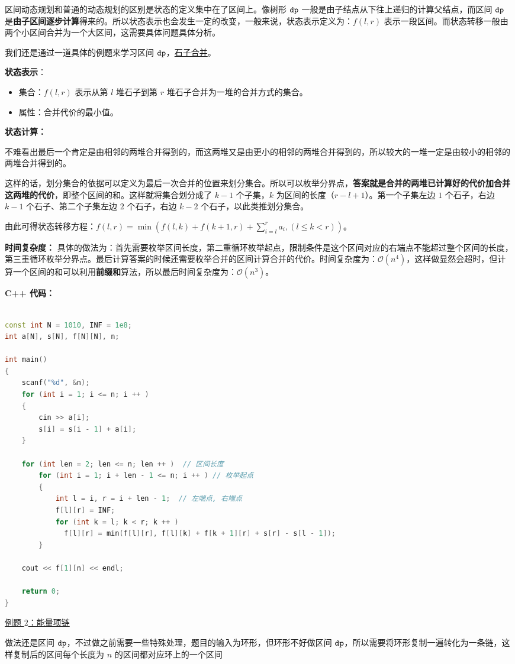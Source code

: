 
区间动态规划和普通的动态规划的区别是状态的定义集中在了区间上。像树形 $\tt dp$ 一般是由子结点从下往上递归的计算父结点，而区间 $\tt dp$ 是\textbf{由子区间逐步计算}得来的。所以状态表示也会发生一定的改变，一般来说，状态表示定义为：$f(l, r)$ 表示一段区间。而状态转移一般由两个小区间合并为一个大区间，这需要具体问题具体分析。

我们还是通过一道具体的例题来学习区间 $\tt dp$，\href{https://www.luogu.com.cn/problem/P1775}{石子合并}。

\textbf{状态表示}：
\begin{itemize}
\item 集合：$f(l, r)$ 表示从第 $l$ 堆石子到第 $r$ 堆石子合并为一堆的合并方式的集合。
\item 属性：合并代价的最小值。
\end{itemize}

\textbf{状态计算：}

不难看出最后一个肯定是由相邻的两堆合并得到的，而这两堆又是由更小的相邻的两堆合并得到的，所以较大的一堆一定是由较小的相邻的两堆合并得到的。

这样的话，划分集合的依据可以定义为最后一次合并的位置来划分集合。所以可以枚举分界点，\textbf{答案就是合并的两堆已计算好的代价加合并这两堆的代价}，即整个区间的和。这样就将集合划分成了 $k - 1$ 个子集，$k$ 为区间的长度（$r - l + 1$）。第一个子集左边 $1$ 个石子，右边 $k - 1$ 个石子、第二个子集左边 $2$ 个石子，右边 $k - 2$ 个石子，以此类推划分集合。

由此可得状态转移方程：$f(l, r) = \min(f(l, k) + f(k + 1, r) + \sum^{r}_{i = l}a_i, (l \leq k < r))$。

\textbf{时间复杂度：} 具体的做法为：首先需要枚举区间长度，第二重循环枚举起点，限制条件是这个区间对应的右端点不能超过整个区间的长度，第三重循环枚举分界点。最后计算答案的时候还需要枚举合并的区间计算合并的代价。时间复杂度为：$\mathcal{O}(n^4)$，这样做显然会超时，但计算一个区间的和可以利用\textbf{前缀和}算法，所以最后时间复杂度为：$\mathcal{O}(n^3)$。

\textbf{C++ 代码：}

\begin{lstlisting}[language=cpp]

const int N = 1010, INF = 1e8;
int a[N], s[N], f[N][N], n;

int main()
{
    scanf("%d", &n);
    for (int i = 1; i <= n; i ++ ) 
    {
        cin >> a[i];
        s[i] = s[i - 1] + a[i];
    }

    for (int len = 2; len <= n; len ++ )  // 区间长度
        for (int i = 1; i + len - 1 <= n; i ++ ) // 枚举起点
        {
            int l = i, r = i + len - 1;  // 左端点, 右端点
            f[l][r] = INF;
            for (int k = l; k < r; k ++ ) 
              f[l][r] = min(f[l][r], f[l][k] + f[k + 1][r] + s[r] - s[l - 1]);
        }

    cout << f[1][n] << endl;

    return 0;
}
\end{lstlisting}

\href{https://www.luogu.com.cn/problem/P1063}{例题 $2$：能量项链}

做法还是区间 $\tt dp$，不过做之前需要一些特殊处理，题目的输入为环形，但环形不好做区间 $\tt dp$，所以需要将环形复制一遍转化为一条链，这样复制后的区间每个长度为 $n$ 的区间都对应环上的一个区间